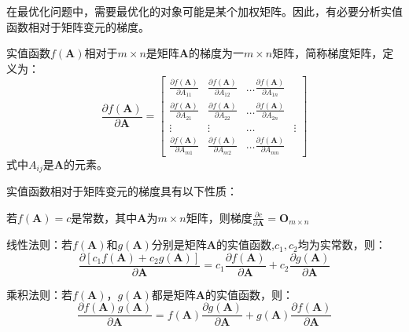 \documentclass[10pt,a4paper,UTF8]{article}
\begin{document}
在最优化问题中，需要最优化的对象可能是某个加权矩阵。因此，有必要分析实值函数相对于矩阵变元的梯度。

实值函数\(f(\mathbf{A})\)相对于\(m\times n\)是矩阵\(\mathbf{A}\)的梯度为一\(m\times n\)矩阵，简称梯度矩阵，定义为：
\begin{equation}
\label{eq:25}
\frac{\partial f(\mathbf{A})}{\partial \mathbf{A}} =
\begin{bmatrix}
\frac{\partial f(\mathbf{A})}{\partial A_{11}} &  \frac{\partial f(\mathbf{A})}{\partial A_{12}} &  \ldots \frac{\partial f(\mathbf{A})}{\partial A_{1n}} \\
\frac{\partial f(\mathbf{A})}{\partial A_{21}} &  \frac{\partial f(\mathbf{A})}{\partial A_{22}} &  \ldots \frac{\partial f(\mathbf{A})}{\partial A_{2n}} \\
\vdots & \vdots & \ldots & \vdots \\
\frac{\partial f(\mathbf{A})}{\partial A_{m1}} &  \frac{\partial f(\mathbf{A})}{\partial A_{m2}} &  \ldots \frac{\partial f(\mathbf{A})}{\partial A_{mn}}
\end{bmatrix}
\end{equation}
式中\(A_{ij}\)是\(\mathbf{A}\)的元素。

实值函数相对于矩阵变元的梯度具有以下性质：

\begin{tikzinstance}


若\(f(\mathbf{A})  = c\)是常数，其中\(\mathbf{A}\)为\(m\times n\)矩阵，则梯度\(\frac{\partial c}{\partial \mathbf{A}} = \mathbf{O}_{m\times n}\)
\end{tikzinstance}

\begin{tikzinstance}


线性法则：若\(f(\mathbf{A})\)和\(g(\mathbf{A})\)分别是矩阵\(\mathbf{A}\)的实值函数,\(c_{1},c_{2}\)均为实常数，则：
\begin{equation}
\label{eq:26}
\frac{\partial [c_{1}f(\mathbf{A}) + c_{2}g(\mathbf{A})]}{\partial \mathbf{A}} = c_{1}\frac{\partial f(\mathbf{A})}{\partial \mathbf{A}} + c_{2}\frac{\partial g(\mathbf{A})}{\partial \mathbf{A}}
\end{equation}
\end{tikzinstance}

\begin{tikzinstance}
乘积法则：若\(f(\mathbf{A})\)，\(g(\mathbf{A})\)都是矩阵\(\mathbf{A}\)的实值函数，则：
\begin{equation}
\label{eq:27}
\frac{\partial f(\mathbf{A})g(\mathbf{A})}{\partial \mathbf{A}} = f(\mathbf{A})\frac{\partial g(\mathbf{A})}{\partial \mathbf{A}} + g(\mathbf{A}) \frac{\partial f(\mathbf{A})}{\partial \mathbf{A}}
\end{equation}
\end{tikzinstance}
\end{document}
